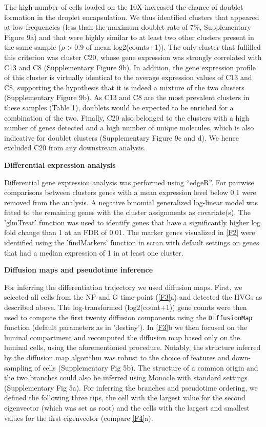 \documentclass[titlepage, 12pt, oneside]{amsart}
\begin{document}
The high number of cells loaded on the 10X increased the chance of doublet formation in the droplet encapsulation\autocite{Zheng2017}. 
We thus identified clusters that appeared at low frequencies (less than the maximum doublet rate of 7\%, Supplementary Figure 9a) and that were highly similar to at least two other clusters present in the same sample ($\rho > 0.9$ of mean log2(counts+1)).
The only cluster that fulfilled this criterion was cluster C20, whose gene expression was strongly correlated with C13 and C8 (Supplementary Figure 9b).
In addition, the gene expression profile of this cluster is virtually identical to the average expression values of C13 and C8, supporting the hypothesis that it is indeed a mixture of the two clusters (Supplementary Figure 9b).
As C13 and C8 are the most prevalent clusters in these samples (Table 1), doublets would be expected to be enriched for a combination of the two.
Finally, C20 also belonged to the clusters with a high number of genes detected and a high number of unique molecules, which is also indicative for doublet clusters (Supplementary Figure 9c and d).
We hence excluded C20 from any downstream analysis.

\textbf{Differential expression analysis }

Differential gene expression analysis was performed using ``edgeR''\autocite{Robinson2010}.
For pairwise comparisons between clusters genes with a mean expression level below 0.1 were removed from the analysis.
A negative binomial generalized log-linear model was fitted to the remaining genes with the cluster assignments as covariate(s).
The 'glmTreat' function was used to identify genes that have a significantly higher log fold change than 1 at an FDR of 0.01.
The marker genes visualized in \autoref{F2} were identified using the 'findMarkers' function in scran with default settings on genes that had a median expression of 1 in at least one cluster\autocite{Lun2016a}.

\textbf{Diffusion maps and pseudotime inference}

For inferring the differentiation trajectory we used diffusion maps.
First, we selected all cells from the NP and G time-point (\autoref{F3}a) and detected the HVGs as described above.
The log-transformed (log2(count+1)) gene counts were then used to compute the first twenty diffusion components using the \texttt{DiffusionMap} function (default parameters as in 'destiny'\autocite{Angerer2016}).
In \autoref{F3}b we then focused on the luminal compartment and recomputed the diffusion map based only on the luminal cells, using the aforementioned procedure.
Notably, the structure inferred by the diffusion map algorithm was robust to the choice of features and down-sampling of cells (Supplementary Fig 5b).
The structure of a common origin and the two branches could also be inferred using Monocle with standard settings\autocite{Trapnell2014} (Supplementary Fig 5a).
For inferring the branches and pseudotime ordering, we defined the following three tips, the cell with the largest value for the second eigenvector (which was set as root) and the cells with the largest and smallest values for the first eigenvector (compare \autoref{F4}a).  
\end{document}
